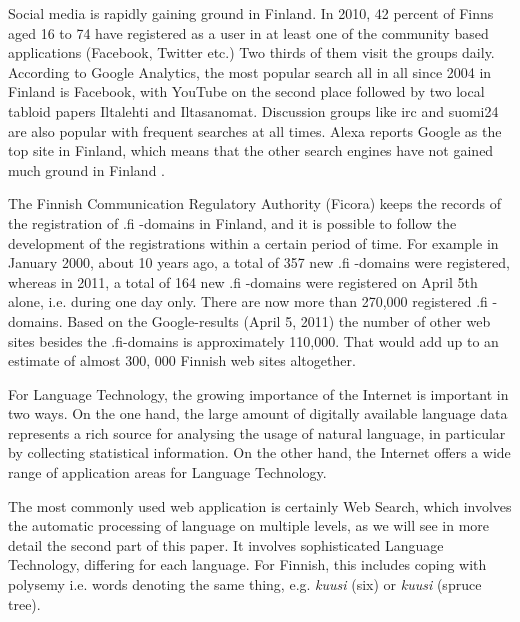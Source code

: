 \documentclass{../../metanetpaper}
\begin{document}
\begin{Parallel}[c]{79mm}{78mm}
{Social media is rapidly gaining ground in Finland. In 2010, 42 percent
of Finns aged 16 to 74 have registered as a user in at least one of the
community based applications (Facebook, Twitter etc.) Two thirds of
them visit the groups daily. According to Google Analytics, the most
popular search all in all since 2004 in Finland is Facebook, with
YouTube on the second place followed by two local tabloid papers
Iltalehti and Iltasanomat. Discussion groups like irc and suomi24 are
also popular with frequent searches at all times. Alexa reports Google
as the top site in Finland, which means that the other search engines
have not gained much ground in Finland \cite{topsites}.

The Finnish Communication Regulatory Authority (Ficora) keeps the
records of the registration of .fi -domains in Finland, and it is
possible to follow the development of the registrations within a
certain period of time. For example in January 2000, about 10 years
ago, a total of 357 new .fi -domains were registered, whereas in 2011,
a total of 164 new .fi -domains were registered on April 5th alone,
i.e. during one day only. There are now more than 270,000 registered
.fi -domains. Based on the Google-results (April 5, 2011) the number
of other web sites besides the .fi-domains is approximately
110,000. That would add up to an estimate of almost 300, 000 Finnish
web sites altogether.

For Language Technology, the growing importance of the Internet is
important in two ways. On the one hand, the large amount of digitally
available language data represents a rich source for analysing the
usage of natural language, in particular by collecting statistical
information. On the other hand, the Internet offers a wide range of
application areas for Language Technology.

The most commonly used web application is certainly Web Search, which
involves the automatic processing of language on multiple levels, as
we will see in more detail the second part of this paper. It involves
sophisticated Language Technology, differing for each language. For
Finnish, this includes coping with polysemy
i.e. words denoting the same thing, e.g.
\textit{\foreignlanguage{finnish}{\textit{kuusi}}} (six) or
\textit{\foreignlanguage{finnish}{\textit{kuusi}}} (spruce tree).

}
\end{Parallel}
\end{document}
